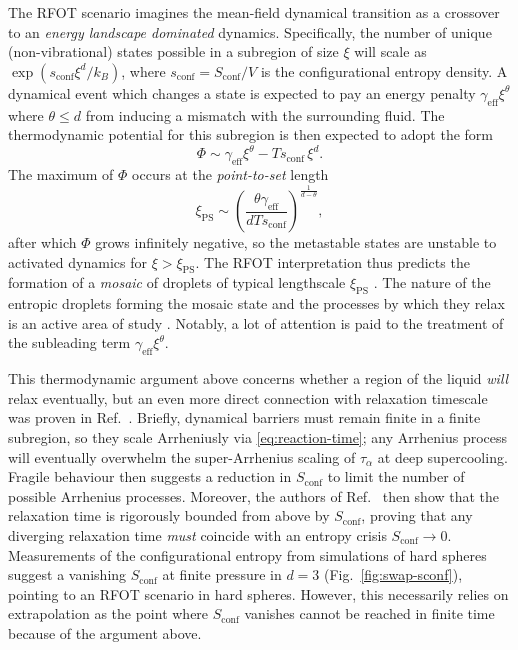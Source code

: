 \documentclass[11pt,twoside]{report}
\begin{document}
The RFOT scenario imagines the mean-field dynamical transition as a crossover to an \emph{energy landscape dominated} dynamics.
Specifically, the number of unique (non-vibrational) states possible in a subregion of size $\xi$ will scale as $\exp{(s_\mathrm{conf} \xi^d / k_B)}$, where $s_\mathrm{conf} = S_\mathrm{conf} / V$ is the configurational entropy density.
A dynamical event which changes a state is expected to pay an energy penalty $\gamma_\mathrm{eff} \xi^\theta$ where $\theta \le d$ from inducing a mismatch with the surrounding fluid.
The thermodynamic potential for this subregion is then expected to adopt the form
\begin{equation}\label{eq:rfot-barrier}
  \Phi \sim \gamma_\mathrm{eff} \xi^\theta - T s_\mathrm{conf} \, \xi^d.
\end{equation}
The maximum of $\Phi$ occurs at the \emph{point-to-set}%
length
\begin{equation}\label{eq:rfot-xi}
  \xi_\mathrm{PS}
  \sim
  \left(
  \frac{\theta \gamma_\mathrm{eff}}{d T s_\mathrm{conf}}
  \right)^\frac{1}{d-\theta},
\end{equation}
after which $\Phi$ grows infinitely negative, so the metastable states are unstable to activated dynamics for $\xi > \xi_\mathrm{PS}$.
The RFOT interpretation thus predicts the formation of a \emph{mosaic} of droplets of typical lengthscale $\xi_\mathrm{PS}$ \cite{KirkpatrickPRB1987,HallJCP1987,KirkpatrickPRA1989,BouchaudJCP2004}.
The nature of the entropic droplets forming the mosaic state and the processes by which they relax is an active area of study \cite{BouchaudJCP2004,DzeroPRB2005,FranzJSM2005,AngeliniJSP2017,RulquinJSM2016,BiroliMeanPRB2018,BiroliFinitePRB2018}.
Notably, a lot of attention is paid to the treatment of the subleading term $\gamma_\mathrm{eff} \xi^\theta$.

This thermodynamic argument above concerns whether a region of the liquid \emph{will} relax eventually, but an even more direct connection with relaxation timescale was proven in Ref.\ \cite{MontanariJSP2006}.
Briefly, dynamical barriers must remain finite in a finite subregion, so they scale Arrheniusly via \eqref{eq:reaction-time}; any Arrhenius process will eventually overwhelm the super-Arrhenius scaling of $\tau_\alpha$ at deep supercooling.
Fragile behaviour then suggests a reduction in $S_\mathrm{conf}$ to limit the number of possible Arrhenius processes.
Moreover, the authors of Ref.\ \cite{MontanariJSP2006} then show that the relaxation time is rigorously bounded from above by $S_\mathrm{conf}$, proving that any diverging relaxation time \emph{must} coincide with an entropy crisis $S_\mathrm{conf} \to 0$.
Measurements of the configurational entropy from simulations of hard spheres suggest a vanishing $S_\mathrm{conf}$ at finite pressure in $d=3$ (Fig.\ \ref{fig:swap-sconf}), pointing to an RFOT scenario in hard spheres.
However, this necessarily relies on extrapolation as the point where $S_\mathrm{conf}$ vanishes cannot be reached in finite time because of the argument above.
\end{document}
